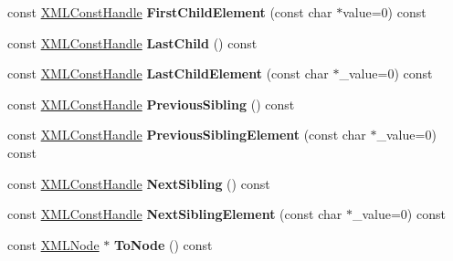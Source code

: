 \begin{DoxyCompactItemize}
const \hyperlink{classtinyxml2_1_1XMLConstHandle}{X\+M\+L\+Const\+Handle} {\bfseries First\+Child\+Element} (const char $\ast$value=0) const
\item 
\mbox{\label{classtinyxml2_1_1XMLConstHandle_a908436124990f3d7b35cb7df20d31d9e}} 
const \hyperlink{classtinyxml2_1_1XMLConstHandle}{X\+M\+L\+Const\+Handle} {\bfseries Last\+Child} () const
\item 
\mbox{\label{classtinyxml2_1_1XMLConstHandle_aea84de60dadee03c994a817b23eac150}} 
const \hyperlink{classtinyxml2_1_1XMLConstHandle}{X\+M\+L\+Const\+Handle} {\bfseries Last\+Child\+Element} (const char $\ast$\+\_\+value=0) const
\item 
\mbox{\label{classtinyxml2_1_1XMLConstHandle_acf68cc7930e4ac883e0c7e16ef2fbb66}} 
const \hyperlink{classtinyxml2_1_1XMLConstHandle}{X\+M\+L\+Const\+Handle} {\bfseries Previous\+Sibling} () const
\item 
\mbox{\label{classtinyxml2_1_1XMLConstHandle_acfe59366330bf4744bb8ec285d723d66}} 
const \hyperlink{classtinyxml2_1_1XMLConstHandle}{X\+M\+L\+Const\+Handle} {\bfseries Previous\+Sibling\+Element} (const char $\ast$\+\_\+value=0) const
\item 
\mbox{\label{classtinyxml2_1_1XMLConstHandle_aec3710e455f41014026ef17fbbb0efb3}} 
const \hyperlink{classtinyxml2_1_1XMLConstHandle}{X\+M\+L\+Const\+Handle} {\bfseries Next\+Sibling} () const
\item 
\mbox{\label{classtinyxml2_1_1XMLConstHandle_a81914a531ed7fd7488edaba584a5d1ca}} 
const \hyperlink{classtinyxml2_1_1XMLConstHandle}{X\+M\+L\+Const\+Handle} {\bfseries Next\+Sibling\+Element} (const char $\ast$\+\_\+value=0) const
\item 
\mbox{\label{classtinyxml2_1_1XMLConstHandle_a61812760cb08bc1b050e65b73a08457b}} 
const \hyperlink{classtinyxml2_1_1XMLNode}{X\+M\+L\+Node} $\ast$ {\bfseries To\+Node} () const
\item 
\mbox{\label{classtinyxml2_1_1XMLConstHandle_a4dba53c6e201d412e915620feaaa56f3}} 

\end{DoxyCompactItemize}
